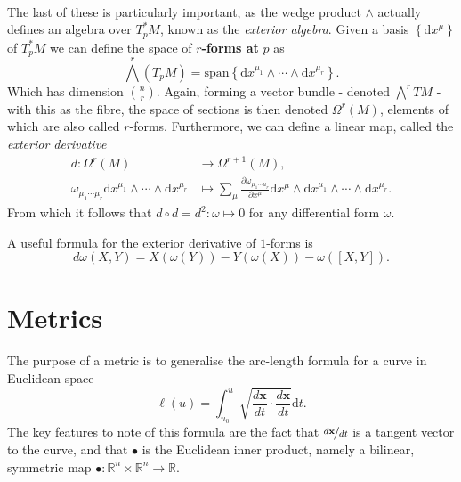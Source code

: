 \documentclass[11pt,fleqn]{report}
\begin{document}
\paragraph{} The last of these is particularly important, as the wedge product $\wedge$ actually defines an algebra over $T_p^*M$, known as the \textit{exterior algebra}. Given a basis $\left\{\mathrm{d}x^\mu\right\}$ of $T_p^*M$ we can define the space of $r$\textbf{-forms at} $p$ as \begin{equation}
\bigwedge^r(T_pM) = \mathrm{span}\left\{\mathrm{d}x^{\mu_1}\wedge\cdots\wedge\mathrm{d}x^{\mu_r}\right\}.
\end{equation}
Which has dimension ${{n}\choose{r}}$. Again, forming a vector bundle - denoted $\bigwedge^rTM$ - with this as the fibre, the space of sections is then denoted $\Omega^r(M)$, elements of which are also called $r$-forms. Furthermore, we can define a linear map, called the \textit{exterior derivative} \begin{align}
d:\Omega^r(M) &\to \Omega^{r+1}(M), \\
\omega_{\mu_1\cdots\mu_r}\mathrm{d}x^{\mu_1}\wedge\cdots\wedge\mathrm{d}x^{\mu_r} &\mapsto \sum_\mu \frac{\partial \omega_{\mu_1\cdots\mu_r}}{\partial x^\mu} \mathrm{d}x^\mu \wedge \mathrm{d}x^{\mu_1}\wedge\cdots\wedge\mathrm{d}x^{\mu_r}.
\end{align}
From which it follows that $d\circ d = d^2: \omega \mapsto 0$ for any differential form $\omega$.

\begin{remark} A useful formula for the exterior derivative of $1$-forms is \begin{equation}
d\omega(X,Y) = X(\omega(Y))-Y(\omega(X)) - \omega([X,Y]).
\end{equation}
\end{remark}

\section{Metrics}

\paragraph{} The purpose of a metric is to generalise the arc-length formula for a curve in Euclidean space \begin{equation}
\ell(u) = \int_{u_0}^u \sqrt{\frac{d\mathbf{x}}{dt}\cdot\frac{d\mathbf{x}}{dt}}\mathrm{d}t.
\end{equation}
The key features to note of this formula are the fact that $\nicefrac{d\mathbf{x}}{dt}$ is a tangent vector to the curve, and that $\bullet$ is the Euclidean inner product, namely a bilinear, symmetric map $\bullet : \mathbb{R}^n \times \mathbb{R}^n \to \mathbb{R}$.
\end{document}

